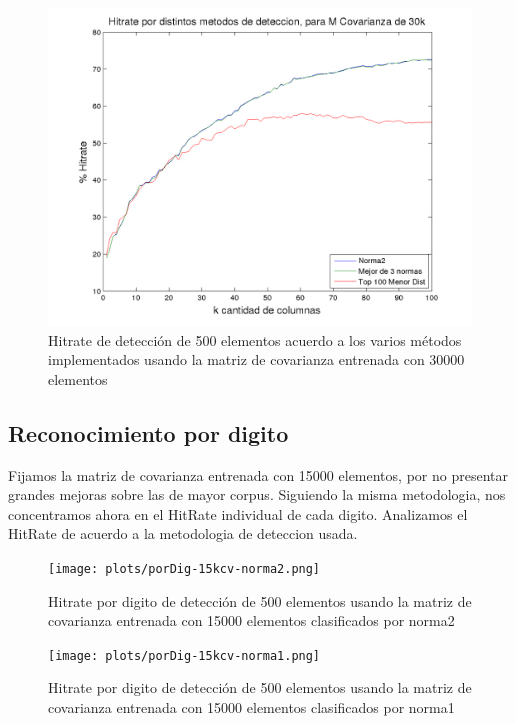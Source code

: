 \begin{figure}[H]
\begin {center}
\includegraphics[width=500pt]{plots/hitrate-30kcv.png}
\end {center}
\caption{Hitrate de detecci\'on de 500 elementos acuerdo a los varios m\'etodos implementados
usando la matriz de covarianza entrenada con 30000 elementos}
\label{fig:HR30kcv}
\end{figure}



\subsection{Reconocimiento por digito}
Fijamos la matriz de covarianza entrenada con 15000 elementos, por no presentar grandes mejoras sobre
las de mayor corpus. Siguiendo la misma metodologia, nos concentramos ahora en el HitRate individual
de cada digito. Analizamos el HitRate de acuerdo a la metodologia de deteccion usada.


\begin{figure}[H]
\begin {center}
\texttt{[image: plots/porDig-15kcv-norma2.png]}
\end {center}
\caption{Hitrate por digito de detecci\'on de 500 elementos usando la matriz de covarianza entrenada con 15000 elementos
clasificados por norma2}
\label{fig:HRD15kcv-n2}
\end{figure}

\begin{figure}[H]
\begin {center}
\texttt{[image: plots/porDig-15kcv-norma1.png]}
\end {center}
\caption{Hitrate por digito de detecci\'on de 500 elementos usando la matriz de covarianza entrenada con 15000 elementos
clasificados por norma1}
\label{fig:HRD15kcv-n1}
\end{figure}

